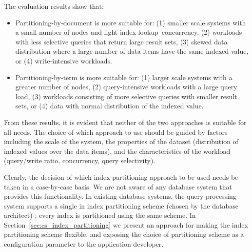 



The evaluation results show that:
\begin{itemize}

  \item Partitioning-by-document is more suitable for:
  (1) smaller scale systems with a small number of nodes and light index lookup concurrency,
  (2) workloads with less selective queries that return large result sets,
  (3) skewed data distribution where a large number of data items have the same indexed value,
  or (4) write-intensive workloads.

  \item Partitioning-by-term is more suitable for:
  (1) larger scale systems with a greater number of nodes,
  (2) query-intensive workloads with a large query load,
  (3) workloads consisting of more selective queries with smaller result sets,
  or (4) data with normal distribution of the indexed value.

\end{itemize}

From these results, it is evident that neither of the two approaches is suitable for all needs.
The choice of which approach to use should be guided by factors including the scale of the system,
the properties of the dataset (distribution of indexed values over the data items),
and the characteristics of the workload (query/write ratio, concurrency, query selectivity).

Clearly, the decision of which index partitioning approach to be used needs be taken in a case-by-case basis.
We are not aware of any database system that provides this functionality.
In existing database systems,
the query processing system supports a single in index partitioning scheme (chosen by the database architect) \cite{kejriwal:slik, tan:diffindex, riakv:secondaryindexes, cassandra:secondaryindexing};
every index is partitioned using the same scheme.
In Section~\ref{sec:cs_index_partitioning} we present an approach for making the index partitioning scheme flexible,
and exposing the choice of partitioning scheme as a configuration parameter to the application developer.

